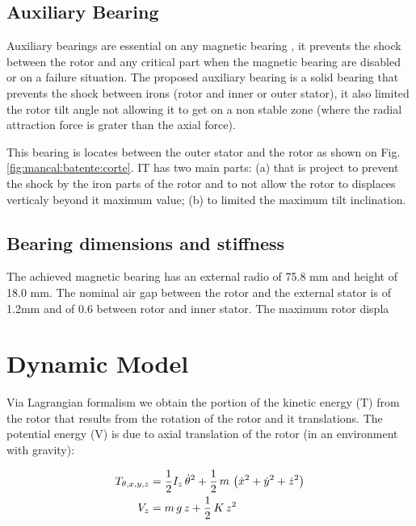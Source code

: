 \documentclass[10pt,fleqn,a4paper,twoside]{article}
\begin{document}
\subsection{Auxiliary Bearing}

Auxiliary bearings are essential on any magnetic bearing , it prevents the shock between the rotor and any critical part when the magnetic bearing are disabled or on a failure situation. The proposed auxiliary bearing is a solid bearing that prevents the shock between irons (rotor and inner or outer stator), it also limited the rotor tilt angle not allowing it to get on a non stable zone (where the radial attraction force is grater than the axial force). 

This bearing is locates between the outer stator and the rotor as shown on Fig. \ref{fig:mancal:batente:corte}. IT has two main parts: (a) that is project to prevent the shock by the iron parts of the rotor and to not allow the rotor to displaces verticaly beyond it maximum value; (b) to limited the maximum tilt inclination.


\subsection{Bearing dimensions and stiffness}

The achieved magnetic bearing has an external radio of 75.8 mm and height of 18.0 mm. The nominal air gap between the rotor and the external stator is of 1.2mm and of 0.6 between rotor and inner stator. The maximum rotor displa


	

\section{Dynamic Model}

Via Lagrangian formalism we obtain the portion of the kinetic energy (T) from the rotor that results from the rotation of the rotor and it translations. The potential energy (V) is due to axial translation of the rotor (in an environment with gravity): 

 \begin{align}
 	T_{\theta, x, y, z} &= \frac{1}{2} I_z \, \dot{\theta}^2 + \frac{1}{2} \, m \, \left( \dot{x}^2 + \dot{y}^2 + \dot{z}^2 \right) \notag \\
 	V_z &= m \, g \, z + \frac{1}{2} \, K \, z^2
 \end{align}
 
\end{document}
